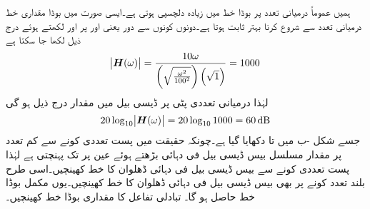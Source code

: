ہمیں عموماً درمیانی تعدد پر بوڈا خط میں زیادہ دلچسپی ہوتی ہے۔ایسی صورت میں بوڈا مقداری خط درمیانی تعدد  سے شروع کرنا بہتر ثابت ہوتا ہے۔دونوں کونوں سے دور یعنی  اور  پر   اور  لکھتے ہوئے درج ذیل لکھا جا سکتا ہے
\begin{align*}
\abs{{{\boldsymbol{H}}}(\omega)}=\frac{10\omega}{\left(\sqrt{\frac{\omega^2}{100^2}}\right)\left(\sqrt{1}\right)}=1000 
\end{align*}
لہٰذا درمیانی تعددی پٹی پر ڈیسی بیل میں مقدار درج ذیل ہو گی
\begin{align*}
20\log_{10}\abs{\bH(\omega)}=20\log_{10} 1000=\SI{60}{\deci\bel} 
\end{align*}
 جسے شکل -ب میں  تا  دکھایا گیا ہے۔چونکہ حقیقت میں پست تعددی کونے  سے کم تعدد پر مقدار مسلسل بیس ڈیسی بیل فی دہائی بڑھتے ہوئے عین   پر  تک پہنچتی ہے لہٰذا پست تعددی کونے سے بیس ڈیسی بیل فی دہائی ڈھلوان کا خط کھینچیں۔اسی طرح بلند تعدد کونے پر بھی بیس ڈیسی بیل فی دہائی ڈھلوان کا خط کھینچیں۔یوں مکمل بوڈا خط حاصل ہو گا۔ 
تبادلی تفاعل  کا مقداری بوڈا خط کھینچیں۔

